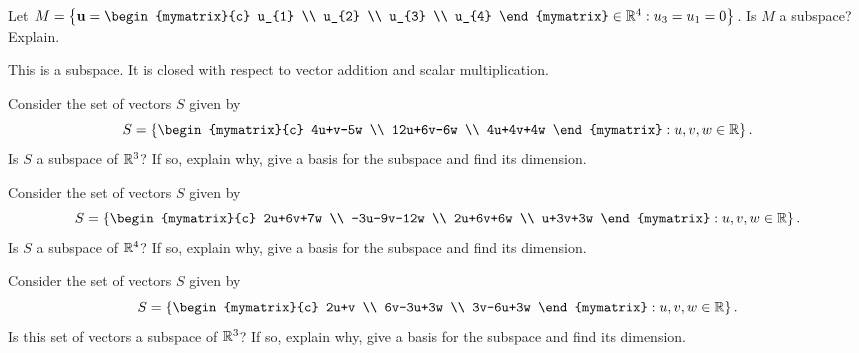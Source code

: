 \begin{enumialphparenastyle}
\begin{ex} Let $M=\set{\vect{u}=\begin{mymatrix}{c}
u_{1} \\
u_{2} \\
u_{3} \\
u_{4}
\end{mymatrix} \in 
\R^{4}:u_{3}=u_{1}=0}$. Is $M$ a subspace? Explain.
\begin{sol}
This is a subspace. It is closed with respect to vector addition and scalar
multiplication.
\end{sol}
\end{ex}

\begin{ex} Consider the set of vectors $S$ given by  
\begin{equation*}
S = 
\set{\begin{mymatrix}{c}
4u+v-5w \\ 
12u+6v-6w \\ 
4u+4v+4w
\end{mymatrix} :u,v,w\in \R} .
\end{equation*}
Is $S$ a subspace of $\mathbb{R}^{3}$? If so, explain why,
give a basis for the subspace and find its dimension.
\end{ex}

\begin{ex} Consider the set of vectors $S$ given by 
\begin{equation*}
S = 
\set{\begin{mymatrix}{c}
2u+6v+7w \\ 
-3u-9v-12w \\ 
2u+6v+6w \\ 
u+3v+3w
\end{mymatrix} :u,v,w\in \R} .
\end{equation*}
Is $S$ a subspace of $\mathbb{R}^{4}$? If so, explain why,
give a basis for the subspace and find its dimension.
\end{ex}

\begin{ex} Consider the set of vectors $S$ given by 
\begin{equation*}
S = 
\set{\begin{mymatrix}{c}
2u+v \\ 
6v-3u+3w \\ 
3v-6u+3w
\end{mymatrix} :u,v,w\in \R} .
\end{equation*}
Is this set of vectors a subspace of $\mathbb{R}^{3}$? If so, explain why,
give a basis for the subspace and find its dimension.
\end{ex}


\end{enumialphparenastyle}
